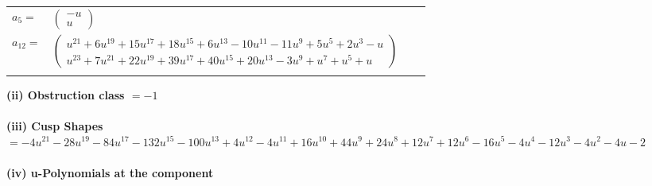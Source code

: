 \documentclass[1p]{elsarticle_modified}
\theoremstyle{definition}
\begin{document}
\begin{tabular}{m{7pt} m{180pt} m{7pt} m{180pt} }
\flushright $a_{5}=$&$\begin{pmatrix}- u\\u\end{pmatrix}$ \\
\flushright $a_{12}=$&$\begin{pmatrix}u^{21}+6 u^{19}+15 u^{17}+18 u^{15}+6 u^{13}-10 u^{11}-11 u^9+5 u^5+2 u^3- u\\u^{23}+7 u^{21}+22 u^{19}+39 u^{17}+40 u^{15}+20 u^{13}-3 u^9+u^7+u^5+u\end{pmatrix}$\\&\end{tabular}
\flushleft \textbf{(ii) Obstruction class $= -1$}\\~\\
\flushleft \textbf{(iii) Cusp Shapes $= -4 u^{21}-28 u^{19}-84 u^{17}-132 u^{15}-100 u^{13}+4 u^{12}-4 u^{11}+16 u^{10}+44 u^9+24 u^8+12 u^7+12 u^6-16 u^5-4 u^4-12 u^3-4 u^2-4 u-2$}\\~\\
\newpage\renewcommand{\arraystretch}{1}
\flushleft \textbf{(iv) u-Polynomials at the component}\newline \\
\end{document}
